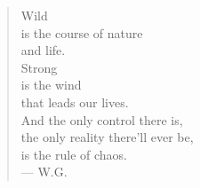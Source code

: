 \begin{quote}
Wild \\
is the course of nature \\
and life. \\
Strong \\
is the wind \\
that leads our lives. \\
And the only control there is, \\
the only reality there'll ever be, \\
is the rule of chaos. \\
--- W.G.
\end{quote}

